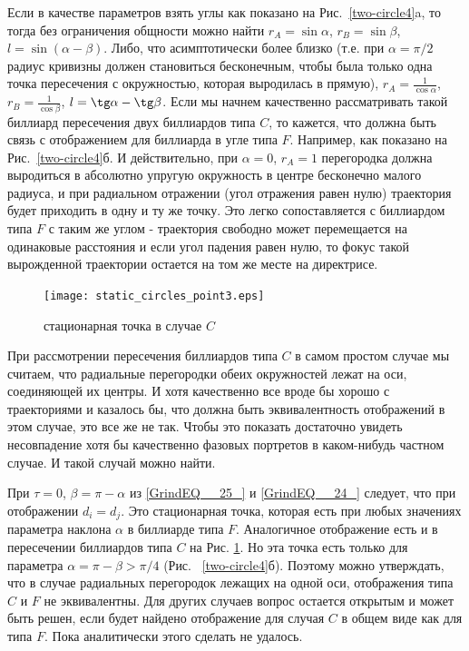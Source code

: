 \documentclass[a4paper]{article}
\begin{document}
Если в качестве параметров взять углы как показано на Рис.~\ref{two-circle4}a, то тогда без ограничения общности можно найти $r_A=\sin\alpha$, $r_B=\sin\beta$, $l=\sin(\alpha-\beta)$. Либо, что асимптотически более близко (т.е. при $\alpha=\pi/2$ радиус кривизны должен становиться бесконечным, чтобы была только одна точка пересечения с окружностью, которая выродилась в прямую), $r_A=\frac{1}{\cos\alpha}$, $r_B=\frac{1}{\cos\beta}$, $l=\tg\alpha-\tg\beta$. Если мы начнем качественно рассматривать такой биллиард пересечения двух биллиардов типа $C$, то кажется, что должна быть связь с отображением для биллиарда в угле типа $F$. Например, как показано на Рис.~\ref{two-circle4}б. И действительно, при $\alpha=0$, $r_A=1$ перегородка должна выродиться в абсолютно упругую окружность в центре бесконечно малого радиуса, и при радиальном отражении (угол отражения равен нулю) траектория будет приходить в одну и ту же точку. Это легко сопоставляется с биллиардом типа $F$ с таким же углом - траектория свободно может перемещается на одинаковые расстояния и если угол падения равен нулю, то фокус такой вырожденной траектории остается на том же месте на директрисе. 
\begin{figure}[ht]
  \centering
  \texttt{[image: static\_circles\_point3.eps]}\\
  \caption{стационарная точка в случае $C$}\label{static_circles_point3}
\end{figure}
При рассмотрении пересечения биллиардов типа $C$ в самом простом случае мы считаем, что радиальные перегородки обеих окружностей лежат на оси, соединяющей их центры. И хотя качественно все вроде бы хорошо с траекториями и казалось бы, что должна быть эквивалентность отображений в этом случае, это все же не так. Чтобы это показать достаточно увидеть несовпадение хотя бы качественно фазовых портретов в каком-нибудь частном случае. И такой случай можно найти. 

При $\tau=0$, $\beta=\pi-\alpha$ из \eqref{GrindEQ__25_} и \eqref{GrindEQ__24_} следует, что при отображении $d_i=d_j$. Это стационарная точка, которая есть при любых значениях параметра наклона $\alpha$ в биллиарде типа $F$. Аналогичное отображение есть и в пересечении биллиардов типа $C$ на Рис. \ref{static_circles_point3}. Но эта точка есть только для параметра $\alpha=\pi-\beta>\pi/4$ (Рис. ~\ref{two-circle4}б). Поэтому можно утверждать, что в случае радиальных перегородок лежащих на одной оси, отображения типа $C$ и $F$ не эквивалентны. Для других случаев вопрос остается открытым и может быть решен, если будет найдено отображение для случая $C$ в общем виде как для типа $F$. Пока аналитически этого сделать не удалось. 
\end{document}
